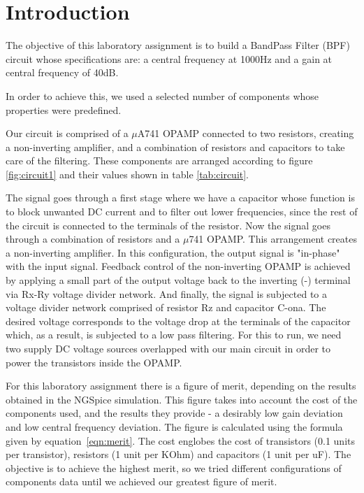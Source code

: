 \section{Introduction}
\label{sec:introduction}
The objective of this laboratory assignment is to build a BandPass Filter (BPF) circuit whose specifications are: a central frequency at 1000Hz and a gain at central frequency of 40dB.

In order to achieve this, we used a selected number of components whose properties were predefined.


Our circuit is comprised of a $\mu$A741 OPAMP connected to two resistors, creating a non-inverting amplifier, and a combination of resistors and capacitors to take care of the filtering. These components are arranged according to figure \ref{fig:circuit1} and their values shown in table \ref{tab:circuit}.

The signal goes through a first stage where we have a capacitor whose function is to block unwanted DC current and to filter out lower frequencies, since the rest of the circuit is connected to the terminals of the resistor. Now the signal goes through a combination of resistors and a $\mu$741 OPAMP. This arrangement creates a non-inverting amplifier. In this configuration, the output signal is "in-phase" with the input signal. Feedback control of the non-inverting OPAMP is achieved by applying a small part of the output voltage back to the inverting (-) terminal via Rx-Ry voltage divider network. And finally, the signal is subjected to a voltage divider network comprised of resistor Rz and capacitor C-ona. The desired voltage corresponds to the voltage drop at the terminals of the capacitor which, as a result, is subjected to a low pass filtering. For this to run, we need two supply DC voltage sources overlapped with our main circuit in order to power the transistors inside the OPAMP.


For this laboratory assignment there is a figure of merit, depending on the results obtained in the NGSpice simulation. This figure takes into account the cost of the components used, and the results they provide - a desirably low gain deviation and low central frequency deviation. The figure is calculated using the formula given by equation~\ref{eqn:merit}. The cost englobes the cost of transistors (0.1 units per transistor), resistors (1 unit per KOhm) and capacitors (1 unit per uF). The objective is to achieve the highest merit, so we tried different configurations of components data until we achieved our greatest figure of merit.



